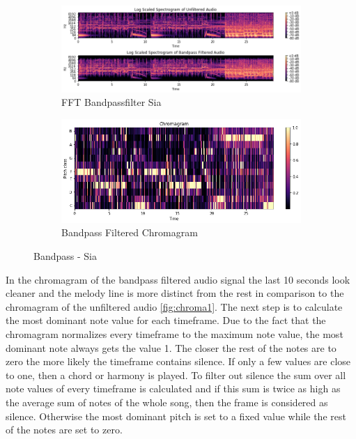 \begin{figure}[htbp]
{{			\begin{subfigure}{.495\textwidth}
				\centering
				\includegraphics[scale=0.3]{Images/Chroma/siafft.png}
				\caption{FFT Bandpassfilter Sia}
				\label{siafft}
			\end{subfigure}%
			\begin{subfigure}{.495\textwidth}
				\centering
				\includegraphics[scale=0.3]{Images/Chroma/chroma_bp.png}
				\caption{Bandpass Filtered Chromagram}
				\label{pvfft}
			\end{subfigure}%
	}}
	\caption{Bandpass - Sia}
	\label{fig:sia2}
\end{figure}
In the chromagram of the bandpass filtered audio signal the last 10 seconds look cleaner and the melody line is more distinct from the rest in comparison to the chromagram of the unfiltered audio \ref{fig:chroma1}.
The next step is to calculate the most dominant note value for each timeframe. Due to the fact that the chromagram normalizes every timeframe to the maximum note value, the most dominant note always gets the value 1. The closer the rest of the notes are to zero the more likely the timeframe contains silence. If only a few values are close to one, then a chord or harmony is played. To filter out silence the sum over all note values of every timeframe is calculated and if this sum is twice as high as the average sum of notes of the whole song, then the frame is considered as silence. Otherwise the most dominant pitch is set to a fixed value while the rest of the notes are set to zero.\\
